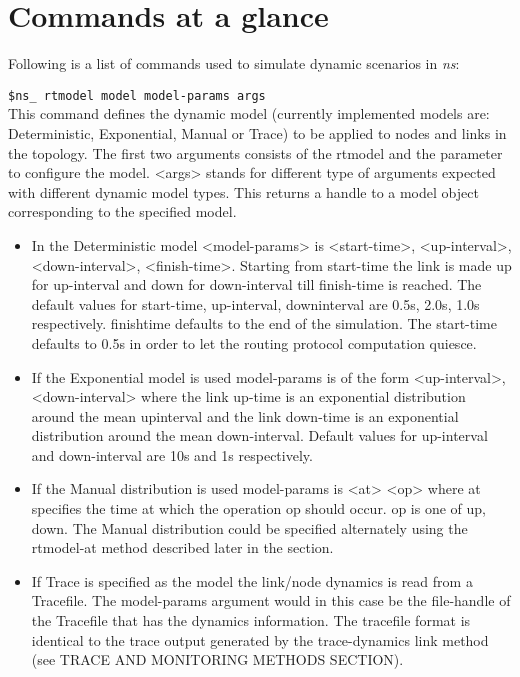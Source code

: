 \section{Commands at a glance}
\label{sec:dynamicscommand}

Following is a list of commands used to simulate dynamic scenarios in \emph{ns}:

\begin{flushleft}
{\tt \$ns\_ rtmodel \<model\> \<model-params\> \<args\>}\\
This command defines the dynamic model (currently implemented models are:
Deterministic, Exponential, Manual or Trace) to be applied to nodes and
links in the topology. The first two arguments consists of the rtmodel and
the parameter to configure the model. <args> stands for different type of
arguments expected with different dynamic model types. This returns a
handle to a model object corresponding to the specified model. 
\begin{itemize}
\item In the Deterministic model <model-params> is <start-time>, 
<up-interval>, <down-interval>, <finish-time>. Starting from start-time
the link is made up for up-interval and down for down-interval till
finish-time is reached. The default values for start-time, up-interval,
downinterval are 0.5s, 2.0s, 1.0s respectively. finishtime defaults to the
end of the simulation. The start-time defaults to 0.5s in order to let the
routing protocol computation quiesce. 

\item If the Exponential model is used model-params is of the form
<up-interval>, <down-interval> where the link up-time is an exponential
distribution around the mean upinterval and the link down-time is an
exponential distribution around the mean down-interval. Default values for
up-interval and down-interval are 10s and 1s respectively. 

\item If the Manual distribution is used model-params is <at> <op> where
at
specifies the time at which the operation op should occur. op is one of
up, down. The Manual distribution could be specified alternately using the
rtmodel-at method described later in the section. 

\item If Trace is specified as the model the link/node dynamics is read
from a
Tracefile. The model-params argument would in this case be the file-handle
of the Tracefile that has the dynamics information. The tracefile format
is identical to the trace output generated by the trace-dynamics link
method (see TRACE AND MONITORING METHODS SECTION). 
\end{itemize}



\end{flushleft}

